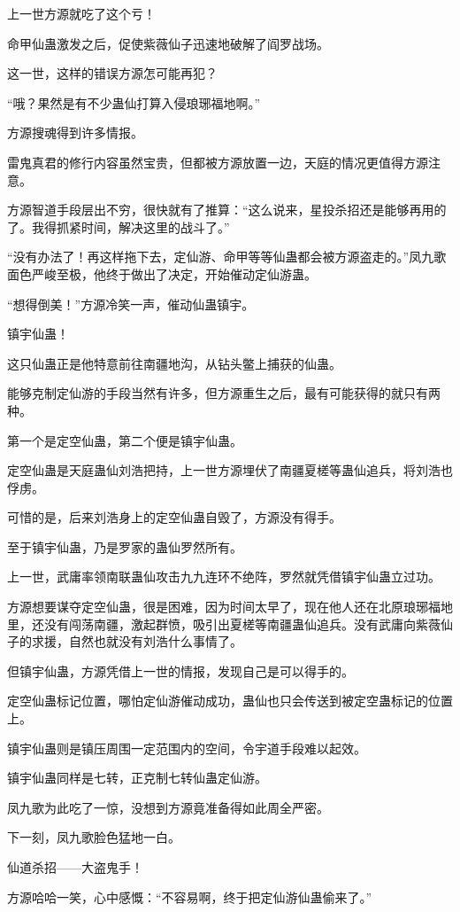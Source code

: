 \begin{this_body}
上一世方源就吃了这个亏！

命甲仙蛊激发之后，促使紫薇仙子迅速地破解了阎罗战场。

这一世，这样的错误方源怎可能再犯？

“哦？果然是有不少蛊仙打算入侵琅琊福地啊。”

方源搜魂得到许多情报。

雷鬼真君的修行内容虽然宝贵，但都被方源放置一边，天庭的情况更值得方源注意。

方源智道手段层出不穷，很快就有了推算：“这么说来，星投杀招还是能够再用的了。我得抓紧时间，解决这里的战斗了。”

“没有办法了！再这样拖下去，定仙游、命甲等等仙蛊都会被方源盗走的。”凤九歌面色严峻至极，他终于做出了决定，开始催动定仙游蛊。

“想得倒美！”方源冷笑一声，催动仙蛊镇宇。

镇宇仙蛊！

这只仙蛊正是他特意前往南疆地沟，从钻头鳖上捕获的仙蛊。

能够克制定仙游的手段当然有许多，但方源重生之后，最有可能获得的就只有两种。

第一个是定空仙蛊，第二个便是镇宇仙蛊。

定空仙蛊是天庭蛊仙刘浩把持，上一世方源埋伏了南疆夏槎等蛊仙追兵，将刘浩也俘虏。

可惜的是，后来刘浩身上的定空仙蛊自毁了，方源没有得手。

至于镇宇仙蛊，乃是罗家的蛊仙罗然所有。

上一世，武庸率领南联蛊仙攻击九九连环不绝阵，罗然就凭借镇宇仙蛊立过功。

方源想要谋夺定空仙蛊，很是困难，因为时间太早了，现在他人还在北原琅琊福地里，还没有闯荡南疆，激起群愤，吸引出夏槎等南疆蛊仙追兵。没有武庸向紫薇仙子的求援，自然也就没有刘浩什么事情了。

但镇宇仙蛊，方源凭借上一世的情报，发现自己是可以得手的。

定空仙蛊标记位置，哪怕定仙游催动成功，蛊仙也只会传送到被定空蛊标记的位置上。

镇宇仙蛊则是镇压周围一定范围内的空间，令宇道手段难以起效。

镇宇仙蛊同样是七转，正克制七转仙蛊定仙游。

凤九歌为此吃了一惊，没想到方源竟准备得如此周全严密。

下一刻，凤九歌脸色猛地一白。

仙道杀招——大盗鬼手！

方源哈哈一笑，心中感慨：“不容易啊，终于把定仙游仙蛊偷来了。”

\end{this_body}

